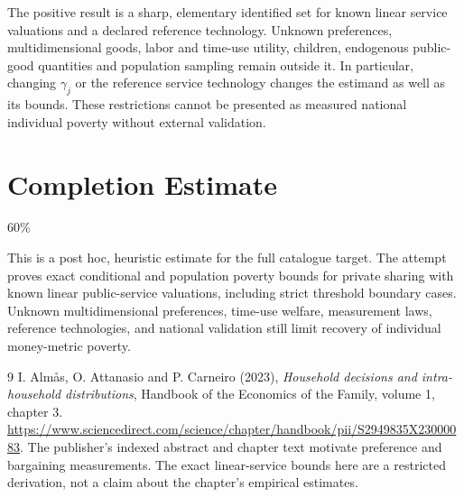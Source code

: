 \documentclass[11pt,a4paper]{article}
\begin{document}
The positive result is a sharp, elementary identified set for known linear service valuations and a declared reference technology. Unknown preferences, multidimensional goods, labor and time-use utility, children, endogenous public-good quantities and population sampling remain outside it. In particular, changing $\gamma_j$ or the reference service technology changes the estimand as well as its bounds. These restrictions cannot be presented as measured national individual poverty without external validation.

\section{Completion Estimate}
60\%

This is a post hoc, heuristic estimate for the full catalogue target.
The attempt proves exact conditional and population poverty bounds for private sharing with known linear public-service valuations, including strict threshold boundary cases. Unknown multidimensional preferences, time-use welfare, measurement laws, reference technologies, and national validation still limit recovery of individual money-metric poverty.

\begin{thebibliography}{9}
 I. Alm\aa s, O. Attanasio and P. Carneiro (2023), \emph{Household decisions and intra-household distributions}, Handbook of the Economics of the Family, volume 1, chapter 3. \url{https://www.sciencedirect.com/science/chapter/handbook/pii/S2949835X23000083}. The publisher's indexed abstract and chapter text motivate preference and bargaining measurements. The exact linear-service bounds here are a restricted derivation, not a claim about the chapter's empirical estimates.
\end{thebibliography}
\end{document}
